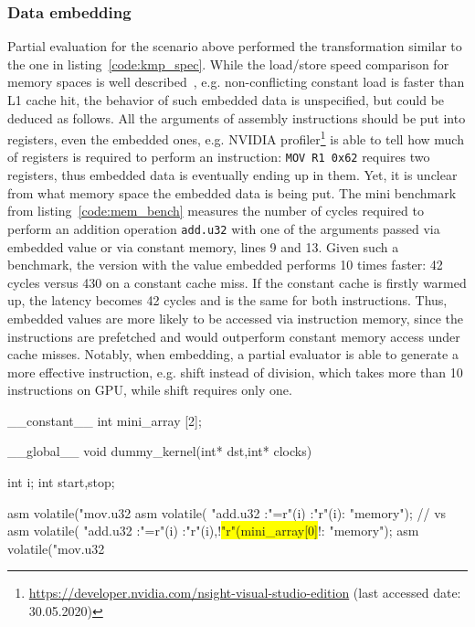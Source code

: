 \subsubsection{Data embedding}\label{data_embedding}
Partial evaluation for the scenario above performed the transformation similar to the one in listing~\ref{code:kmp_spec}. While the load/store speed comparison for memory spaces is well described~\cite{TeslaT4Bench}, e.g. non-conflicting constant load is faster than L1 cache hit, the behavior of such embedded data is unspecified, but could be deduced as follows. All the arguments of assembly instructions should be put into registers, even the embedded ones, e.g. NVIDIA profiler\footnote{\url{https://developer.nvidia.com/nsight-visual-studio-edition} (last accessed date: 30.05.2020)} is able to tell how much of registers is required to perform an instruction: \lstinline{MOV R1 0x62} requires two registers, thus embedded data is eventually ending up in them. Yet, it is unclear from what memory space the embedded data is being put. The mini benchmark from listing~\ref{code:mem_bench} measures the number of cycles required to perform an addition operation \lstinline{add.u32} with one of the arguments passed via embedded value or via constant memory, lines 9 and 13. Given such a benchmark, the version with the value embedded performs 10 times faster: 42 cycles versus 430 on a constant cache miss. If the constant cache is firstly warmed up, the latency becomes 42 cycles and is the same for both instructions. Thus, embedded values are more likely to be accessed via instruction memory, since the instructions are prefetched and would outperform constant memory access under cache misses. Notably, when embedding, a partial evaluator is able to generate a more effective instruction, e.g. shift instead of division, which takes more than 10 instructions on GPU, while shift requires only one.

\begin{code}[language=C, caption=Memory benchmark,label=code:mem_bench,escapechar=!]
__constant__ int mini_array [2];

__global__ void dummy_kernel(int* dst,int* clocks){
    
    int i;
    int start,stop;
    
    asm volatile("mov.u32 %
    asm volatile(
                 "add.u32 %
                 :"=r"(i) :"r"(i): "memory");
    // vs
    asm volatile(
                 "add.u32 %
                 :"=r"(i) :"r"(i),!\colorbox{yellow}{"r"(mini\_array[0]}!: "memory");
    asm volatile("mov.u32 %
}
\end{code}

